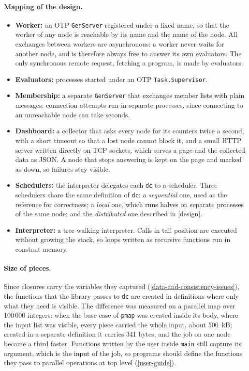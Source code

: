\documentclass{scrartcl}
\begin{document}
\paragraph{Mapping of the design.}
\begin{itemize}
  \item \textbf{Worker:} an OTP \texttt{GenServer} registered under a fixed name, so that the worker of any node is reachable by its name and the name of the node. All exchanges between workers are asynchronous: a worker never waits for another node, and is therefore always free to answer its own evaluators. The only synchronous remote request, fetching a program, is made by evaluators.
  \item \textbf{Evaluators:} processes started under an OTP \texttt{Task.Supervisor}.
  \item \textbf{Membership:} a separate \texttt{GenServer} that exchanges member lists with plain messages; connection attempts run in separate processes, since connecting to an unreachable node can take seconds.
  \item \textbf{Dashboard:} a collector that asks every node for its counters twice a second, with a short timeout so that a lost node cannot block it, and a small HTTP server written directly on TCP sockets, which serves a page and the collected data as JSON. A node that stops answering is kept on the page and marked as down, so failures stay visible.
  \item \textbf{Schedulers:} the interpreter delegates each \texttt{dc} to a scheduler. Three schedulers share the same definition of \texttt{dc}: a \emph{sequential} one, used as the reference for correctness; a \emph{local} one, which runs halves on separate processes of the same node; and the \emph{distributed} one described in \cref{design}.
  \item \textbf{Interpreter:} a tree-walking interpreter. Calls in tail position are executed without growing the stack, so loops written as recursive functions run in constant memory.
\end{itemize}

\paragraph{Size of pieces.}
Since closures carry the variables they captured (\cref{data-and-consistency-issues}), the functions that the library passes to \texttt{dc} are created in definitions where only what they need is visible.
%
The difference was measured on a parallel map over 100\,000 integers: when the base case of \texttt{pmap} was created inside its body, where the input list was visible, every piece carried the whole input, about 500~kB; created in a separate definition it carries 341 bytes, and the job on one node became a third faster.
%
Functions written by the user inside \texttt{main} still capture its argument, which is the input of the job, so programs should define the functions they pass to parallel operations at top level (\cref{user-guide}).
\end{document}
